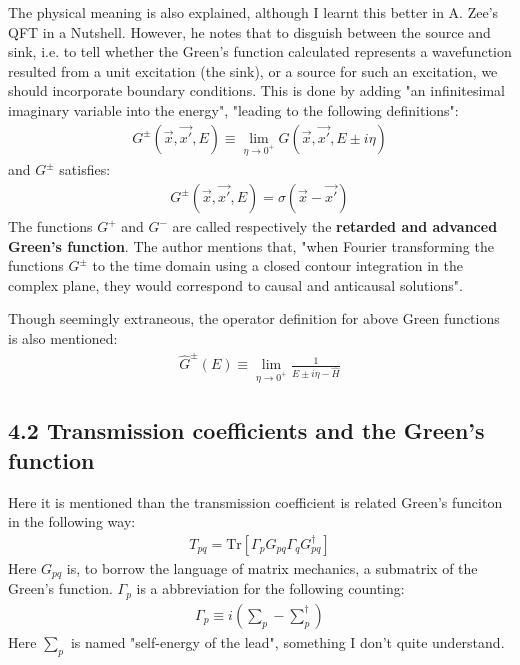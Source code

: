 \documentclass{article}
\numberwithin{equation}{subsection} %
\theoremstyle{definition}
\begin{document}
    The physical meaning is also explained, although I learnt this
    better in A. Zee's QFT in a Nutshell. However, he notes that
    to disguish between the source and sink, i.e. to tell whether
    the Green's function calculated represents a wavefunction
    resulted from a unit excitation (the sink), or a source for such
    an excitation, we should incorporate boundary conditions. This is
    done by adding "an infinitesimal imaginary variable into the energy",
    "leading to the following definitions":
    \begin{align}
        G^{\pm}(\vec{x},\vec{x'},E)\equiv \lim_{\eta\to 0^{+}}
            G(\vec{x},\vec{x'},E\pm i\eta)
    \end{align}
    and $G^{\pm}$ satisfies:
    \begin{align}
        [E\pm i\eta - H(\vec{x})] G^{\pm}(\vec{x},\vec{x'},E)=
            \sigma(\vec{x}-\vec{x'})
    \end{align}
    The functions $G^+$ and $G^-$ are called respectively the
    \textbf{retarded and advanced Green's function}. The author
    mentions that, "when Fourier transforming the functions $G^\pm$ to
    the time domain using a closed contour integration in the complex 
    plane, they would correspond to causal and anticausal solutions".

    Though seemingly extraneous, the operator definition for above
    Green functions is also mentioned:
    \begin{align}
        \hat{G}^{\pm}(E)\equiv \lim_{\eta\to 0^+}
            \frac{1}{E\pm i\eta-\hat{H}}
    \end{align}
    \subsection{4.2 Transmission coefficients and the Green’s function}
    \label{sec:4.2_Transmission_coefficients_and_the_Greens_function}
    
    Here it is mentioned than the transmission coefficient is related
    Green's funciton in the following way:
    \begin{align}
        T_{pq} = \text{Tr}\left[\Gamma_p G_{pq}\Gamma_q G^{\dagger}_{pq}
                \right]
    \end{align}
    Here $G_{pq}$ is, to borrow the language of matrix mechanics,
    a submatrix of the Green's function. $\Gamma_p$ is a abbreviation
    for the following counting:
    \begin{align}
        \label{eq:}
        \Gamma_p \equiv i(\sum_p-\sum^\dagger_p)
    \end{align}
    Here $\sum_p$ is named "self-energy of the lead", something I
    don't quite understand.
\end{document}

